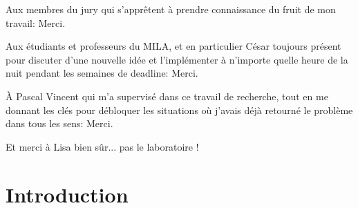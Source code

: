 \documentclass[12pt,maitrise,nobabel,anglais,twoside,initial]{template/dms}
\numberwithin{equation}{section}
\numberwithin{table}{chapter}
\numberwithin{figure}{chapter}
\begin{document}
Aux membres du jury qui s'apprêtent à prendre connaissance du fruit de mon travail: Merci.

Aux étudiants et professeurs du MILA, et en particulier César toujours présent pour discuter d'une nouvelle idée et l'implémenter à n'importe quelle heure de la nuit pendant les semaines de deadline: Merci. 

À Pascal Vincent qui m'a supervisé dans ce travail de recherche, tout en me donnant les clés pour débloquer les situations où j'avais déjà retourné le problème dans tous les sens: Merci.

Et merci à Lisa bien sûr... pas le laboratoire !


\NoChapterPageNumber 
\cleardoublepage



\chapter*{Introduction}





\




% 
\end{document}

